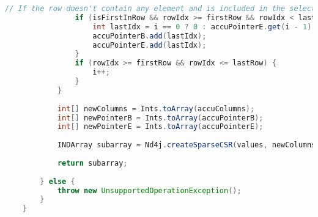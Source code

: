 \begin{lstlisting}[caption=Extract a sub-array of a CSR matrix\label{lst:getcsc},language=Java]
				// If the row doesn't contain any element and is included in the selected rows
				if (isFirstInRow && rowIdx >= firstRow && rowIdx < lastRow) {
					int lastIdx = i == 0 ? 0 : accuPointerE.get(i - 1);
					accuPointerB.add(lastIdx);
					accuPointerE.add(lastIdx);
				}
				if (rowIdx >= firstRow && rowIdx <= lastRow) {
					i++;
				}
			}
			
			int[] newColumns = Ints.toArray(accuColumns);
			int[] newPointerB = Ints.toArray(accuPointerB);
			int[] newPointerE = Ints.toArray(accuPointerE);
			
			INDArray subarray = Nd4j.createSparseCSR(values, newColumns, newPointerB, newPointerE, shape);
			
			return subarray;
		
		} else {
			throw new UnsupportedOperationException();
		}
	}
		\end{lstlisting}
